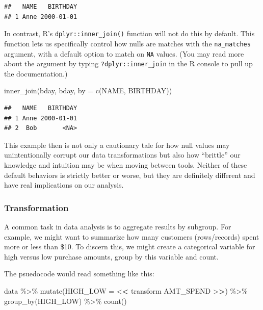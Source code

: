 \documentclass[
]{krantz}
\makeatletter
\newenvironment{Shaded}{\begin{snugshade}}{\end{snugshade}}
\newcommand{\AttributeTok}[1]{\textcolor[rgb]{0.61,0.61,0.61}{#1}}
\newcommand{\ErrorTok}[1]{\textcolor[rgb]{0.14,0.14,0.14}{\textbf{#1}}}
\newcommand{\FunctionTok}[1]{\textcolor[rgb]{0,0,0}{#1}}
\newcommand{\NormalTok}[1]{#1}
\newcommand{\SpecialCharTok}[1]{\textcolor[rgb]{0,0,0}{#1}}
\newcommand{\StringTok}[1]{\textcolor[rgb]{0.5,0.5,0.5}{#1}}
\newenvironment{kframe}{%
\medskip{}
\setlength{\fboxsep}{.8em}
 \def\at@end@of@kframe{}%
 \ifinner\ifhmode%
  \def\at@end@of@kframe{\end{minipage}}%
  \begin{minipage}{\columnwidth}%
 \fi\fi%
 \def\FrameCommand##1{\hskip\@totalleftmargin \hskip-\fboxsep
 \colorbox{shadecolor}{##1}\hskip-\fboxsep
     \hskip-\linewidth \hskip-\@totalleftmargin \hskip\columnwidth}%
 \MakeFramed {\advance\hsize-\width
   \@totalleftmargin\z@ \linewidth\hsize
   \@setminipage}}%
 {\par\unskip\endMakeFramed%
 \at@end@of@kframe}
\renewenvironment{Shaded}{\begin{kframe}}{\end{kframe}}
\makeatother
\begin{document}
\begin{verbatim}
##   NAME   BIRTHDAY
## 1 Anne 2000-01-01
\end{verbatim}

In contrast, R's \texttt{dplyr::inner\_join()} function will not do this by default.
This function lets us specifically control how nulls are matches with the \texttt{na\_matches} argument, with a default option to match on \texttt{NA} values.
(You may read more about the argument by typing \texttt{?dplyr::inner\_join} in the R console to pull up the documentation.)

\begin{Shaded}
\begin{Highlighting}[]
\FunctionTok{inner\_join}\NormalTok{(bday, bday, }\AttributeTok{by =} \FunctionTok{c}\NormalTok{(}\StringTok{\textquotesingle{}NAME\textquotesingle{}}\NormalTok{, }\StringTok{\textquotesingle{}BIRTHDAY\textquotesingle{}}\NormalTok{))}
\end{Highlighting}
\end{Shaded}

\begin{verbatim}
##   NAME   BIRTHDAY
## 1 Anne 2000-01-01
## 2  Bob       <NA>
\end{verbatim}

This example then is not only a cautionary tale for how null values may unintentionally corrupt our data transformations but also how ``brittle'' our knowledge and intuition may be when moving between tools.
Neither of these default behaviors is strictly better or worse, but they are definitely different and have real implications on our analysis.

\hypertarget{transformation}{%
\subsubsection{Transformation}\label{transformation}}

A common task in data analysis is to aggregate results by subgroup.
For example, we might want to summarize how many customers (rows/records) spent more or less than \$10. To discern this, we might create a categorical variable for high versus low purchase amounts, group by this variable and count.

The psuedocode would read something like this:

\begin{Shaded}
\begin{Highlighting}[]
\NormalTok{data }\SpecialCharTok{\%\textgreater{}\%}
  \FunctionTok{mutate}\NormalTok{(}\AttributeTok{HIGH\_LOW =} \SpecialCharTok{\textless{}}\ErrorTok{\textless{}}\NormalTok{ transform AMT\_SPEND }\SpecialCharTok{\textgreater{}}\ErrorTok{\textgreater{}}\NormalTok{) }\SpecialCharTok{\%\textgreater{}\%}
  \FunctionTok{group\_by}\NormalTok{(HIGH\_LOW) }\SpecialCharTok{\%\textgreater{}\%}
  \FunctionTok{count}\NormalTok{()}
\end{Highlighting}
\end{Shaded}
\end{document}
